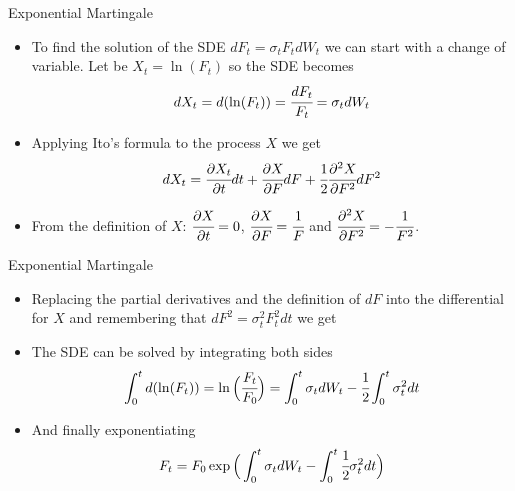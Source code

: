 \documentclass{beamer}
\begin{document}
\begin{frame}{Exponential Martingale}
 \begin{itemize}
	\item<1-> To find the solution of the SDE $dF_t = \sigma_tF_tdW_t$ we can start with a change of variable. Let be $X_t=\ln(F_t)$ so the SDE becomes
	\begin{equation*}
	dX_t = d(\ln(F_t)) = \cfrac{dF_t}{F_t}=\sigma_tdW_t
   \end{equation*}
  \item<2-> Applying Ito's formula to the process $X$ we get
	\begin{equation*}
		dX_t = \cfrac{\partial X_t}{\partial t}dt + \cfrac{\partial X}{\partial F}dF + \cfrac{1}{2}\cfrac{\partial^2 X}{\partial F^2}dF^2
   \end{equation*}
	\item<3-> From the definition of $X$: $\cfrac{\partial X}{\partial t}=0$, $\cfrac{\partial X}{\partial F}=\cfrac{1}{F}$ and $\cfrac{\partial^2 X}{\partial F^2}=-\cfrac{1}{F^2}$.
\end{itemize}
\end{frame}

\begin{frame}{Exponential Martingale}
 \begin{itemize}
	\item<1-> Replacing the partial derivatives and the definition of $dF$ into the differential for $X$ and remembering that $dF^2 = \sigma_t^2 F_t^2 dt$ we get
  \item<3-> The SDE can be solved by integrating both sides
	\begin{equation*}
	\int_0^t d(\ln(F_t)) = \ln\Big(\cfrac{F_t}{F_0}\Big)= \int_0^t \sigma_t dW_t - \cfrac{1}{2}\int_0^t\sigma_t^2 dt
	\end{equation*}
  \item<4-> And finally exponentiating
	\begin{equation*}
		F_t = F_0 \exp\Big(\int_0^t \sigma_t dW_t - \int_0^t\cfrac{1}{2}\sigma_t^2 dt\Big)
	\end{equation*}
	\myendproof
\end{itemize}
\end{frame}
\end{document}
